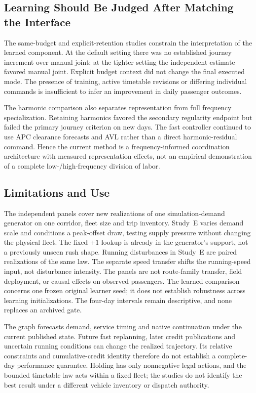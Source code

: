\subsection{Learning Should Be Judged After Matching the Interface}
The same-budget and explicit-retention studies constrain the interpretation of the learned component. At the default setting there was no established journey increment over manual joint; at the tighter setting the independent estimate favored manual joint. Explicit budget context did not change the final executed mode. The presence of training, active timetable revisions or differing individual commands is insufficient to infer an improvement in daily passenger outcomes.

The harmonic comparison also separates representation from full frequency specialization. Retaining harmonics favored the secondary regularity endpoint but failed the primary journey criterion on new days. The fast controller continued to use APC clearance forecasts and AVL rather than a direct harmonic-residual command. Hence the current method is a frequency-informed coordination architecture with measured representation effects, not an empirical demonstration of a complete low-/high-frequency division of labor.

\subsection{Limitations and Use}
\label{sec:limitations}
The independent panels cover new realizations of one simulation-demand generator on one corridor, fleet size and trip inventory. Study~E varies demand scale and conditions a peak-offset draw, testing supply pressure without changing the physical fleet. The fixed $+1$ lookup is already in the generator's support, not a previously unseen rush shape. Running disturbances in Study~E are paired realizations of the same law. The separate speed transfer shifts the running-speed input, not disturbance intensity. The panels are not route-family transfer, field deployment, or causal effects on observed passengers. The learned comparison concerns one frozen original learner seed; it does not establish robustness across learning initializations. The four-day intervals remain descriptive, and none replaces an archived gate.

The graph forecasts demand, service timing and native continuation under the current published state. Future fast replanning, later credit publications and uncertain running conditions can change the realized trajectory. Its relative constraints and cumulative-credit identity therefore do not establish a complete-day performance guarantee. Holding has only nonnegative legal actions, and the bounded timetable law acts within a fixed fleet; the studies do not identify the best result under a different vehicle inventory or dispatch authority.

